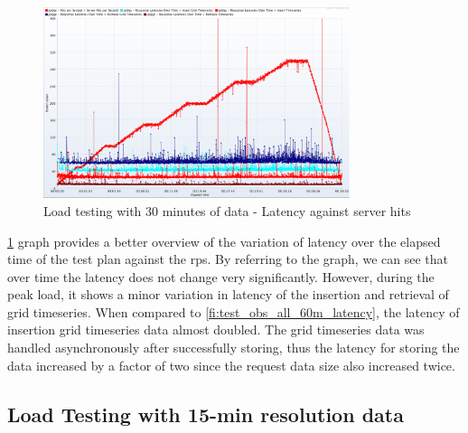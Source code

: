 \begin{figure}[htp]
    \centering
    \includegraphics[width=0.8\textwidth]{results/obs/all/obs_all_30m_res_latencies_against_hits.png}
    \caption{Load testing with 30 minutes of data - Latency against server hits}
    \label{fi:test_obs_all_30m_latency}
\end{figure}
\cref{fi:test_obs_all_30m_latency} graph provides a better overview of the variation of latency over the elapsed time of the test plan against the \acrshort{rps}. By referring to the graph, we can see that over time the latency does not change very significantly. However, during the peak load, it shows a minor variation in latency of the insertion and retrieval of grid timeseries. When compared to \cref{fi:test_obs_all_60m_latency}, the latency of insertion grid timeseries data almost doubled. The grid timeseries data was handled asynchronously after successfully storing, thus the latency for storing the data increased by a factor of two since the request data size also increased twice.


\subsection{Load Testing with 15-min resolution data}
\label{subse:obs_test_plan_all_15min}

